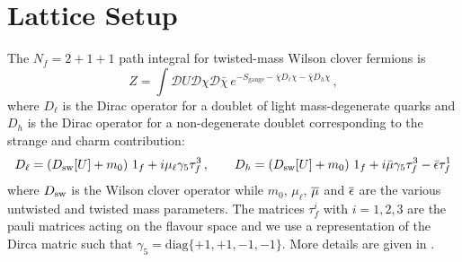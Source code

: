 \documentclass[a4paper,11pt]{article}
\begin{document}
\section{Lattice Setup}
The $N_f =2+1+1$ path integral for twisted-mass Wilson clover fermions \cite{Frezzotti:2003ni,Frezzotti:2004wz,Sheikholeslami:1985ij} is
\begin{equation}
  Z= \int \mathcal{D}U \mathcal{D}\chi \mathcal{D}\bar\chi \,e^{-S_\mathrm{gauge}-\bar \chi D_\ell\chi - \bar \chi D_h \chi } \,,
\end{equation}
where $D_\ell$ is the Dirac operator for a doublet of light mass-degenerate quarks and $D_h$ is the Dirac operator for a non-degenerate doublet corresponding to the strange and charm contribution:
\begin{equation}
  D_\ell = (D_{\mathrm{sw}}[U] + m_0)\ 1_f + i \mu_\ell\gamma_5\tau^3_f\, ,\quad\quad
  D_h = (D_{\mathrm{sw}}[U] + m_0)\ 1_f + i\bar\mu\gamma_5\tau^3_f - \bar\epsilon \tau^1_f
\end{equation}
where $D_{\mathrm{sw}}$ is the Wilson clover operator while $m_0$, $\mu_\ell$, $\overline{\mu}$ and $\overline{\epsilon}$ are the various untwisted and twisted mass parameters. The matrices $\tau_f^i$ with $i=1,2,3$ are the pauli matrices acting on the flavour space and we use a representation of the Dirca matric such that  $\gamma_5=\text{diag}\{+1,+1,-1,-1\}$. More details are given in \cite{ExtendedTwistedMass:2021qui}.
\end{document}
